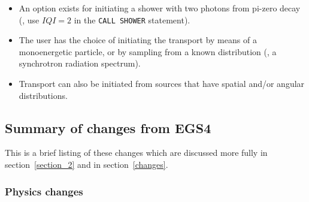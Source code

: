 \begin{itemize}
\begin{itemize} 
  \item An option exists for initiating a shower with two
  photons from pi-zero decay (\ie, use $IQI=2$ in the
  {\tt CALL SHOWER} statement). 
   
  \item The user has the choice of initiating the transport
  by means of a monoenergetic particle, or by sampling from
  a known distribution (\eg, a synchrotron radiation spectrum).
   
  \item Transport can also be initiated from sources that have
  spatial and/or angular distributions.

  \end{itemize} 
\end{itemize} 


\newpage
\subsection{Summary of changes from EGS4}
\label{changes_summary}
This is a brief listing of these changes which are discussed more fully in
section~\ref{section_2} and in section~\ref{changes}.

\subsubsection{Physics changes}

